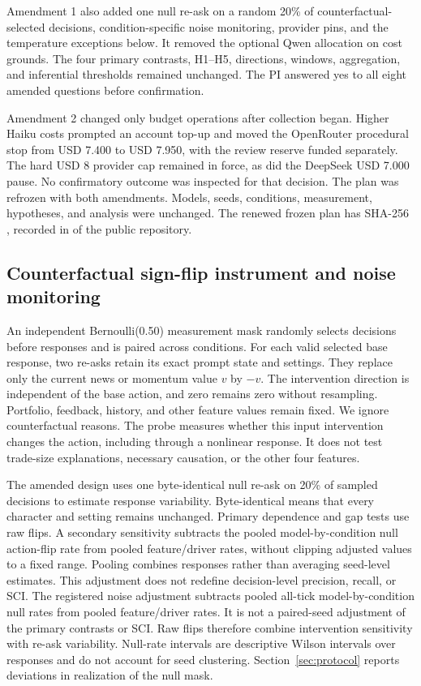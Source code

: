 \documentclass[a4paper]{article}
\begin{document}
Amendment 1 also added one null re-ask on a random 20\% of counterfactual-selected decisions, condition-specific noise monitoring, provider pins, and the temperature exceptions below. It removed the optional Qwen allocation on cost grounds. The four primary contrasts, H1--H5, directions, windows, aggregation, and inferential thresholds remained unchanged. The PI answered yes to all eight amended questions before confirmation.

Amendment 2 changed only budget operations after collection began. Higher Haiku costs prompted an account top-up and moved the OpenRouter procedural stop from USD 7.400 to USD 7.950, with the review reserve funded separately. The hard USD 8 provider cap remained in force, as did the DeepSeek USD 7.000 pause. No confirmatory outcome was inspected for that decision. The plan was refrozen with both amendments. Models, seeds, conditions, measurement, hypotheses, and analysis were unchanged. The renewed frozen plan has SHA-256 \allowbreak{}, recorded in  of the public repository.

\subsection{Counterfactual sign-flip instrument and noise monitoring}\label{sec:noise}
An independent Bernoulli(0.50) measurement mask randomly selects decisions before responses and is paired across conditions. For each valid selected base response, two re-asks retain its exact prompt state and settings. They replace only the current news or momentum value $v$ by $-v$. The intervention direction is independent of the base action, and zero remains zero without resampling. Portfolio, feedback, history, and other feature values remain fixed. We ignore counterfactual reasons. The probe measures whether this input intervention changes the action, including through a nonlinear response. It does not test trade-size explanations, necessary causation, or the other four features.

The amended design uses one byte-identical null re-ask on 20\% of sampled decisions to estimate response variability. Byte-identical means that every character and setting remains unchanged. Primary dependence and gap tests use raw flips. A secondary sensitivity subtracts the pooled model-by-condition null action-flip rate from pooled feature/driver rates, without clipping adjusted values to a fixed range. Pooling combines responses rather than averaging seed-level estimates. This adjustment does not redefine decision-level precision, recall, or SCI. The registered noise adjustment subtracts pooled all-tick model-by-condition null rates from pooled feature/driver rates. It is not a paired-seed adjustment of the primary contrasts or SCI. Raw flips therefore combine intervention sensitivity with re-ask variability. Null-rate intervals are descriptive Wilson intervals over responses and do not account for seed clustering. Section~\ref{sec:protocol} reports deviations in realization of the null mask.
\end{document}
